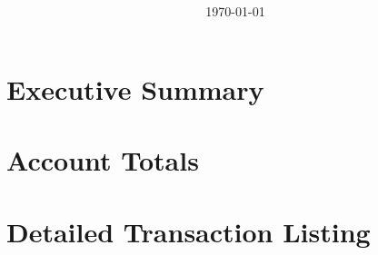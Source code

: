 \documentclass[11pt]{article}
\title{\textbf{\VAR{data.report_name}}}
\author{{\VAR{data.organization_name}}}
\date{\today}
\begin{document}
\maketitle
\newpage

\section { Executive Summary }

\newpage

\section { Account Totals }

\newpage

\section { Detailed Transaction Listing }
\end{document}
